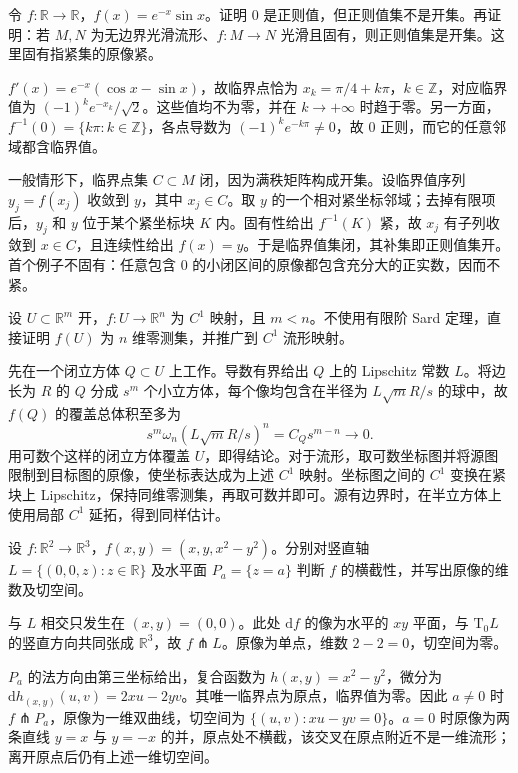 \begin{exercise}\label{g2:ex:regular-values-not-open}
	令 \(f:\mathbb R\to\mathbb R\)，\(f(x)=e^{-x}\sin x\)。证明 \(0\) 是正则值，但正则值集不是开集。再证明：若 \(M,N\) 为无边界光滑流形、\(f:M\to N\) 光滑且固有，则正则值集是开集。这里固有指紧集的原像紧。
\end{exercise}
\begin{solution}
	\(f'(x)=e^{-x}(\cos x-\sin x)\)，故临界点恰为 \(x_k=\pi/4+k\pi\)，\(k\in\mathbb Z\)，对应临界值为 \((-1)^ke^{-x_k}/\sqrt2\)。这些值均不为零，并在 \(k\to+\infty\) 时趋于零。另一方面，\(f^{-1}(0)=\{k\pi:k\in\mathbb Z\}\)，各点导数为 \((-1)^ke^{-k\pi}\ne0\)，故 \(0\) 正则，而它的任意邻域都含临界值。

	一般情形下，临界点集 \(C\subset M\) 闭，因为满秩矩阵构成开集。设临界值序列 \(y_j=f(x_j)\) 收敛到 \(y\)，其中 \(x_j\in C\)。取 \(y\) 的一个相对紧坐标邻域；去掉有限项后，\(y_j\) 和 \(y\) 位于某个紧坐标块 \(K\) 内。固有性给出 \(f^{-1}(K)\) 紧，故 \(x_j\) 有子列收敛到 \(x\in C\)，且连续性给出 \(f(x)=y\)。于是临界值集闭，其补集即正则值集开。首个例子不固有：任意包含 \(0\) 的小闭区间的原像都包含充分大的正实数，因而不紧。
\end{solution}

\begin{exercise}\label{g2:ex:c1-small-dimensional-image}
	设 \(U\subset\mathbb R^m\) 开，\(f:U\to\mathbb R^n\) 为 \(C^1\) 映射，且 \(m<n\)。不使用有限阶 Sard 定理，直接证明 \(f(U)\) 为 \(n\) 维零测集，并推广到 \(C^1\) 流形映射。
\end{exercise}
\begin{solution}
	先在一个闭立方体 \(Q\subset U\) 上工作。导数有界给出 \(Q\) 上的 Lipschitz 常数 \(L\)。将边长为 \(R\) 的 \(Q\) 分成 \(s^m\) 个小立方体，每个像均包含在半径为 \(L\sqrt mR/s\) 的球中，故 \(f(Q)\) 的覆盖总体积至多为
	\[
		s^m\omega_n(L\sqrt mR/s)^n=C_Qs^{m-n}\longrightarrow0.
	\]
	用可数个这样的闭立方体覆盖 \(U\)，即得结论。对于流形，取可数坐标图并将源图限制到目标图的原像，使坐标表达成为上述 \(C^1\) 映射。坐标图之间的 \(C^1\) 变换在紧块上 Lipschitz，保持同维零测集，再取可数并即可。源有边界时，在半立方体上使用局部 \(C^1\) 延拓，得到同样估计。
\end{solution}

\begin{exercise}\label{g2:ex:transversality-saddle-graph}
	设 \(f:\mathbb R^2\to\mathbb R^3\)，\(f(x,y)=(x,y,x^2-y^2)\)。分别对竖直轴 \(L=\{(0,0,z):z\in\mathbb R\}\) 及水平面 \(P_a=\{z=a\}\) 判断 \(f\) 的横截性，并写出原像的维数及切空间。
\end{exercise}
\begin{solution}
	与 \(L\) 相交只发生在 \((x,y)=(0,0)\)。此处 \(\mathrm{d}f\) 的像为水平的 \(xy\) 平面，与 \(\mathrm{T}_0L\) 的竖直方向共同张成 \(\mathbb R^3\)，故 \(f\pitchfork L\)。原像为单点，维数 \(2-2=0\)，切空间为零。

	\(P_a\) 的法方向由第三坐标给出，复合函数为 \(h(x,y)=x^2-y^2\)，微分为 \(\mathrm{d}h_{(x,y)}(u,v)=2xu-2yv\)。其唯一临界点为原点，临界值为零。因此 \(a\ne0\) 时 \(f\pitchfork P_a\)，原像为一维双曲线，切空间为 \(\{(u,v):xu-yv=0\}\)。\(a=0\) 时原像为两条直线 \(y=x\) 与 \(y=-x\) 的并，原点处不横截，该交叉在原点附近不是一维流形；离开原点后仍有上述一维切空间。
\end{solution}

